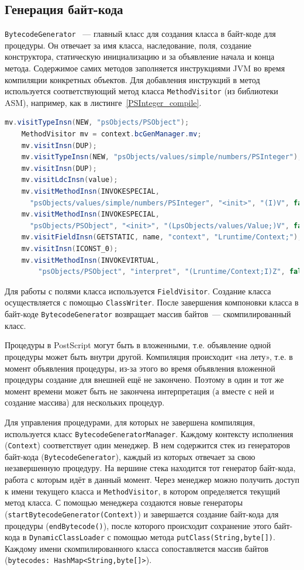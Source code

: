 	\subsection{Генерация байт-кода}
	\texttt{BytecodeGenerator} ~--- главный класс для создания класса в байт-коде для процедуры. Он отвечает за имя класса, наследование, поля, создание конструктора, статическую инициализацию и за объявление начала и конца метода. Содержимое самих методов заполняется инструкциями JVM во время компиляции конкретных объектов. Для добавления инструкций в метод используется соответствующий метод класса \texttt{MethodVisitor} (из библиотеки ASM), например, как в листинге~\ref{PSInteger_compile}. 
	\begin{lstlisting}[label=PSInteger_compile,caption=Компиляция объектов \texttt{Integer} ,captionpos=b, frame = single,language = Java]     mv.visitTypeInsn(NEW, "psObjects/PSObject");
	MethodVisitor mv = context.bcGenManager.mv;
	mv.visitInsn(DUP);
	mv.visitTypeInsn(NEW, "psObjects/values/simple/numbers/PSInteger");
	mv.visitInsn(DUP);
	mv.visitLdcInsn(value);
	mv.visitMethodInsn(INVOKESPECIAL, 
	  "psObjects/values/simple/numbers/PSInteger", "<init>", "(I)V", false);
	mv.visitMethodInsn(INVOKESPECIAL,
	  "psObjects/PSObject", "<init>", "(LpsObjects/values/Value;)V", false);		
	mv.visitFieldInsn(GETSTATIC, name, "context", "Lruntime/Context;");
	mv.visitInsn(ICONST_0);
	mv.visitMethodInsn(INVOKEVIRTUAL,
		"psObjects/PSObject", "interpret", "(Lruntime/Context;I)Z", false);
	\end{lstlisting}
	Для работы с полями класса используется \texttt{FieldVisitor}. Создание класса осуществляется с помощью \texttt{ClassWriter}. После завершения компоновки класса в байт-коде \texttt{BytecodeGenerator}	возвращает массив байтов~--- скомпилированный класс.
	
	Процедуры в PostScript могут быть в вложенными, т.е. объявление одной процедуры может быть внутри другой. Компиляция происходит «на лету», т.е. в момент объявления процедуры, из-за этого во время объявления вложенной процедуры создание для внешней ещё не закончено. Поэтому в один и тот же момент времени может быть не закончена интерпретация (а вместе с ней и создание массива) для нескольких процедур.
	
	Для управления процедурами, для которых не завершена компиляция, используется класс \texttt{BytecodeGeneratorManager}. Каждому контексту исполнения (\texttt{Context}) соответствует один менеджер. В нем содержится стек из генераторов байт-кода (\texttt{BytecodeGenerator}), каждый из которых отвечает за свою незавершенную процедуру. На вершине стека находится тот генератор байт-кода, работа с которым идёт в данный момент. Через менеджер можно получить доступ к имени текущего класса и \texttt{MethodVisitor}, в котором определяется текущий метод класса. С помощью менеджера создаются новые генераторы (\texttt{startBytecodeGenerator(Context)}) и завершается создание  байт-кода для процедуры (\texttt{endBytecode()}), после которого происходит сохранение этого байт-кода в \texttt{DynamicClassLoader} с помощью метода \texttt{putClass(String,byte[])}. Каждому имени скомпилированного класса сопоставляется массив байтов (\texttt{bytecodes: HashMap<String,byte[]>}).
	
